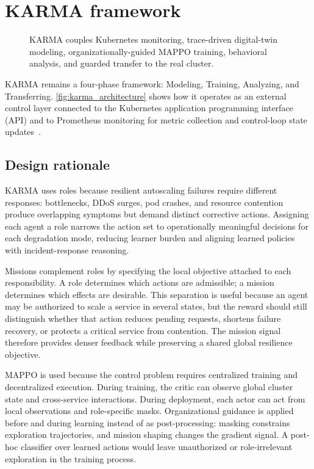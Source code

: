 \documentclass[journal]{IEEEtran}
\begin{document}
\section{KARMA framework}
\label{sec:karma_framework}

\begin{figure}[t]
  \centering
  
  \caption{KARMA couples Kubernetes monitoring, trace-driven digital-twin modeling, organizationally-guided MAPPO training, behavioral analysis, and guarded transfer to the real cluster.}
  \label{fig:karma_architecture}
\end{figure}

KARMA remains a four-phase framework: Modeling, Training, Analyzing, and Transferring. \autoref{fig:karma_architecture} shows how it operates as an external control layer connected to the Kubernetes application programming interface (API) and to Prometheus monitoring for metric collection and control-loop state updates~\cite{Toka2020,prometheus}.

\subsection{Design rationale}

KARMA uses roles because resilient autoscaling failures require different responses: bottlenecks, DDoS surges, pod crashes, and resource contention produce overlapping symptoms but demand distinct corrective actions. Assigning each agent a role narrows the action set to operationally meaningful decisions for each degradation mode, reducing learner burden and aligning learned policies with incident-response reasoning.

Missions complement roles by specifying the local objective attached to each responsibility. A role determines which actions are admissible; a mission determines which effects are desirable. This separation is useful because an agent may be authorized to scale a service in several states, but the reward should still distinguish whether that action reduces pending requests, shortens failure recovery, or protects a critical service from contention. The mission signal therefore provides denser feedback while preserving a shared global resilience objective.

MAPPO is used because the control problem requires centralized training and decentralized execution. During training, the critic can observe global cluster state and cross-service interactions. During deployment, each actor can act from local observations and role-specific masks. Organizational guidance is applied before and during learning instead of as post-processing: masking constrains exploration trajectories, and mission shaping changes the gradient signal. A post-hoc classifier over learned actions would leave unauthorized or role-irrelevant exploration in the training process.
\end{document}
